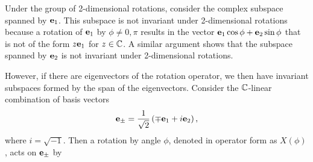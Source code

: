 \begin{example}
    Under the group of 2-dimensional rotations, consider the complex subspace spanned by $\mathbf{e}_1$. This subspace is not invariant under 2-dimensional rotations because a rotation of $\mathbf{e}_1$ by $\phi\neq 0,\pi$ results in the vector $\mathbf{e}_1\cos\phi + \mathbf{e}_2\sin\phi$ that is not of the form $z\mathbf{e}_1$ for $z\in\mathbb{C}$. A similar argument shows that the subspace spanned by $\mathbf{e}_2$ is not invariant under 2-dimensional rotations.

    However, if there are eigenvectors of the rotation operator, we then have invariant subspaces formed by the span of the eigenvectors.
    Consider the $\mathbb{C}$-linear combination of basis vectors
    \begin{equation}
        \mathbf{e}_\pm = \frac{1}{\sqrt{2}}\left( \mp\mathbf{e}_1 + i\mathbf{e}_2 \right),
    \end{equation}
    where $i = \sqrt{-1}$. Then a rotation by angle $\phi$, denoted in operator form as $X(\phi)$, acts on $\mathbf{e}_\pm$ by
    \begin{align}
        \begin{split}            

\end{split}
\end{align}
\end{example}
